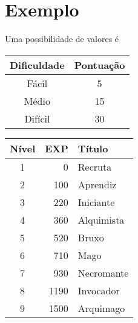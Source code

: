 \documentclass[a4paper,11pt]{report}
\numberwithin{equation}{section}
\begin{document}
\section{ Exemplo }

Uma possibilidade de valores é
\begin{center}
  \begin{tabular}{|c|c|} \hline
   {\bf Dificuldade } & {\bf Pontuação} \\ \hline
   Fácil & 5  \\ \hline
   Médio & 15 \\ \hline
   Difícil & 30 \\ \hline
  \end{tabular}
  \vspace{1cm}

  \begin{tabular}{|c|r|l|} \hline
  {\bf Nível} & {\bf EXP} & {\bf Título} \\ \hline
  1 &    0 & Recruta \\ \hline
  2 &  100 & Aprendiz \\ \hline
  3 &  220 & Iniciante \\ \hline
  4 &  360 & Alquimista \\ \hline
  5 &  520 & Bruxo \\ \hline
  6 &  710 & Mago \\ \hline
  7 &  930 & Necromante \\ \hline
  8 & 1190 & Invocador \\ \hline
  9 & 1500 & Arquimago \\ \hline
  \end{tabular}
\end{center}
\end{document}
